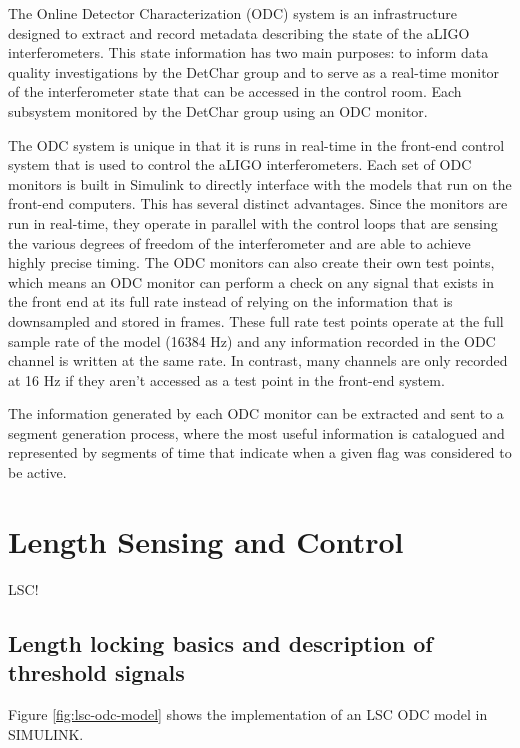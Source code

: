 The Online Detector Characterization (ODC) system is an infrastructure designed 
to extract and record metadata describing the state of the aLIGO interferometers. 
This state information has two main purposes: to inform data quality investigations 
by the DetChar group and to serve as a real-time monitor of the interferometer state 
that can be accessed in the control room. Each subsystem monitored by the DetChar group 
using an ODC monitor.

The ODC system is unique in that it is runs in real-time in the front-end control 
system that is used to control the aLIGO interferometers. Each set of ODC monitors 
is built in Simulink to directly interface with the models that run on the front-end 
computers. This has several distinct advantages. 
Since the monitors are run in real-time, they operate in parallel with the control 
loops that are sensing the various degrees of freedom of the interferometer and are 
able to achieve highly precise timing. The ODC monitors can also create their own 
test points, which means an ODC monitor can perform a check on any signal that exists 
in the front end at its full rate instead of relying on the information that is 
downsampled and stored in frames. 
These full rate test points operate at the full sample rate of the model (16384 Hz) 
and any information recorded in the ODC channel is written at the same rate. In contrast, 
many channels are only recorded at 16 Hz if they aren't accessed as a test point in the front-end system. 

The information generated by each ODC monitor can be extracted and sent to a segment 
generation process, where the most useful information is catalogued and represented by 
segments of time that indicate when a given flag was considered to be active.  


\section{Length Sensing and Control}
LSC!

\subsection{Length locking basics and description of threshold signals}

Figure \ref{fig:lsc-odc-model} shows the implementation of an LSC ODC 
model in SIMULINK. 

